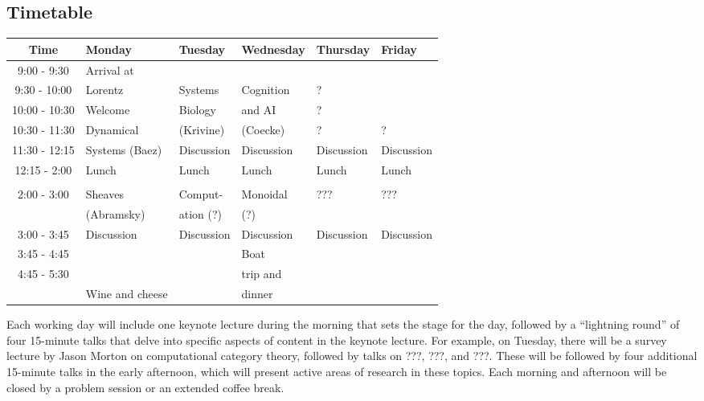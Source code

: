 \documentclass{article}
\newcommand{\redout}[1]{{\color{red}#1}}
\begin{document}
\subsection{Timetable}
\begin{table}[h!]
\begin{center}
\begin{tabular}{|c||p{.15\linewidth}|p{.15\linewidth}|p{.15\linewidth}|p{.15\linewidth}|p{.15\linewidth}|}
\hline
Time & Monday & Tuesday & Wednesday & Thursday & Friday \\ \hline
9:00 - 9:30 & Arrival at & & & & \\ \cline{3-6}
9:30 - 10:00 & Lorentz & Systems & Cognition & ? & \\ \cline{2-2}
10:00 - 10:30 & Welcome & Biology & and AI & ? & \\ \cline{2-2}
10:30 - 11:30 & Dynamical & (Krivine) & (Coecke) & ? & ? \\  \cline{3-6}
11:30 - 12:15 & Systems (Baez) & Discussion & Discussion & Discussion & Discussion \\ \hline
12:15 - 2:00 & Lunch & Lunch & Lunch & Lunch & Lunch \\
&&&&& \\ \hline
2:00 - 3:00 & Sheaves & Comput- & Monoidal & ??? & ??? \\
& (Abramsky) & ation (?) & (?) & & \\ \hline
3:00 - 3:45 & Discussion & Discussion & Discussion & Discussion & Discussion \\ \hline
3:45 - 4:45 & & & Boat & & \\ 
4:45 - 5:30 & & & trip and & & \\ \cline{2-3} \cline{5-6}
& Wine and cheese & & dinner & &  \\ \hline
\end{tabular}
\end{center}
\end{table}%

Each working day will include one keynote lecture during the morning that sets the stage for the day, followed by a ``lightning round'' of four 15-minute talks that delve into specific aspects of content in the keynote lecture. For example, on Tuesday, there will be a survey lecture by \redout{Jason Morton} on computational category theory, followed by talks on \redout{???}, \redout{???}, and \redout{???}. These will be followed by four additional 15-minute talks in the early afternoon, which will present active areas of research in these topics. Each morning and afternoon will be closed by a problem session or an extended coffee break. 
\end{document}
